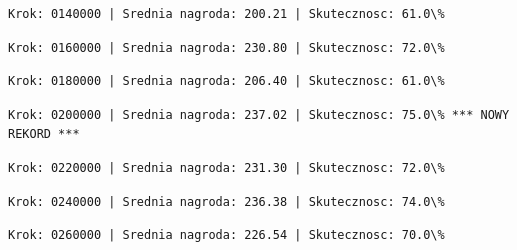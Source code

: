\documentclass[11pt]{article}
\begin{document}
    
    
    \begin{Verbatim}[commandchars=\\\{\}]
Krok: 0140000 | Srednia nagroda: 200.21 | Skutecznosc: 61.0\%

    \end{Verbatim}

    
    
    \begin{Verbatim}[commandchars=\\\{\}]
Krok: 0160000 | Srednia nagroda: 230.80 | Skutecznosc: 72.0\%

    \end{Verbatim}

    
    
    \begin{Verbatim}[commandchars=\\\{\}]
Krok: 0180000 | Srednia nagroda: 206.40 | Skutecznosc: 61.0\%

    \end{Verbatim}

    
    
    \begin{Verbatim}[commandchars=\\\{\}]
Krok: 0200000 | Srednia nagroda: 237.02 | Skutecznosc: 75.0\% *** NOWY REKORD ***

    \end{Verbatim}

    
    
    \begin{Verbatim}[commandchars=\\\{\}]
Krok: 0220000 | Srednia nagroda: 231.30 | Skutecznosc: 72.0\%

    \end{Verbatim}

    
    
    \begin{Verbatim}[commandchars=\\\{\}]
Krok: 0240000 | Srednia nagroda: 236.38 | Skutecznosc: 74.0\%

    \end{Verbatim}

    
    
    \begin{Verbatim}[commandchars=\\\{\}]
Krok: 0260000 | Srednia nagroda: 226.54 | Skutecznosc: 70.0\%

    \end{Verbatim}
\end{document}
